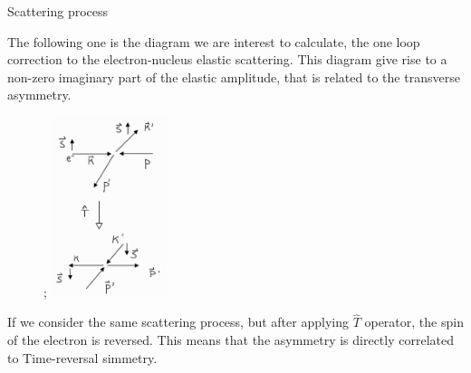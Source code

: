 \documentclass[8pt,a4paper]{beamer}
\begin{document}
\begin{frame}{Scattering process}

The following one is the diagram we are interest to calculate,  the one loop correction to the electron-nucleus elastic scattering. This diagram give rise to a non-zero imaginary part of the elastic amplitude, that is related to the transverse asymmetry.

\begin{figure}[hbtp]
;
\hspace{2cm}
\includegraphics[width = 0.30\textwidth]{figures/time.jpg} 
\end{figure}

If we consider the same scattering process, but after applying $\hat{T}$ operator, the spin of the electron is reversed. This means that the asymmetry is directly correlated to Time-reversal simmetry. 

\end{frame}
\end{document}
